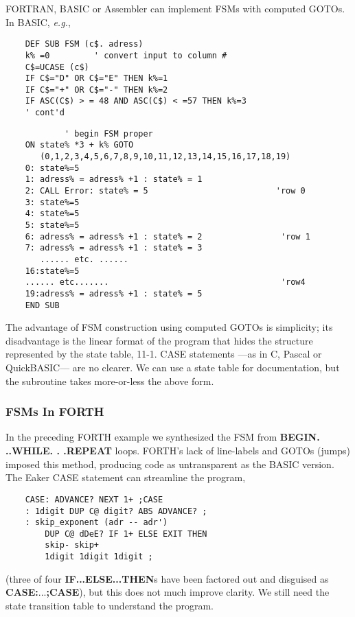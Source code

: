 FORTRAN, BASIC or Assembler can implement FSMs with computed GOTOs. In BASIC, \textit{e.g.},

\begin{verbatim}
    DEF SUB FSM (c$. adress)
    k% =0         ' convert input to column #
    C$=UCASE (c$)
    IF C$="D" OR C$="E" THEN k%=1
    IF C$="+" OR C$="-" THEN k%=2
    IF ASC(C$) > = 48 AND ASC(C$) < =57 THEN k%=3
    ' cont'd
\end{verbatim}

\begin{verbatim}
            ' begin FSM proper
    ON state% *3 + k% GOTO
       (0,1,2,3,4,5,6,7,8,9,10,11,12,13,14,15,16,17,18,19)
    0: state%=5
    1: adress% = adress% +1 : state% = 1
    2: CALL Error: state% = 5                          'row 0
    3: state%=5
    4: state%=5
    5: state%=5
    6: adress% = adress% +1 : state% = 2                'row 1
    7: adress% = adress% +1 : state% = 3
       ...... etc. ......
    16:state%=5
    ...... etc.......                                   'row4
    19:adress% = adress% +1 : state% = 5
    END SUB
\end{verbatim}

The advantage of FSM construction using computed GOTOs is simplicity; its disadvantage is the linear format of the program that hides the structure represented by the state table, 11-1. CASE statements —as in C, Pascal or QuickBASIC— are no clearer. We can use a state table for documentation, but the subroutine takes more-or-less the above form.

\subsubsection{FSMs In FORTH}

In the preceding FORTH example we synthesized the FSM from \textbf{BEGIN. ..WHILE. . .REPEAT} loops. FORTH’s lack of line-labels and GOTOs (jumps) imposed this method, producing code as untransparent as the BASIC version. The Eaker CASE statement can streamline the program,

\begin{verbatim}
    CASE: ADVANCE? NEXT 1+ ;CASE
    : 1digit DUP C@ digit? ABS ADVANCE? ;
    : skip_exponent (adr -- adr')
        DUP C@ dDeE? IF 1+ ELSE EXIT THEN
        skip- skip+
        1digit 1digit 1digit ;
\end{verbatim}

(three of four \textbf{IF...ELSE...THEN}s have been factored out and disguised as \textbf{CASE:}...\textbf{;CASE}), but this does not much improve clarity. We still need the state transition table to understand the program.

